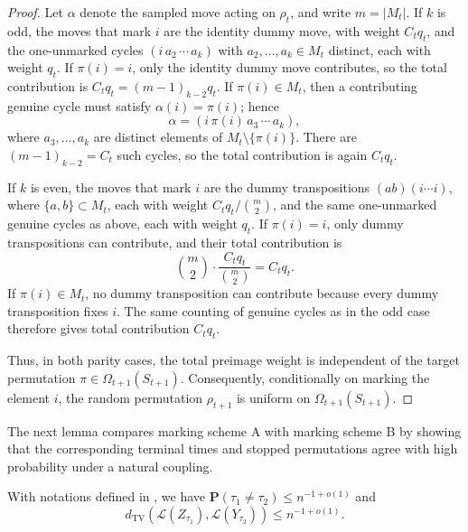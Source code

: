 \begin{proof}
Let $\alpha$ denote the sampled move acting on $\rho_t$, and write
$m=|M_t|$. If $k$ is odd, the moves that mark $i$ are the identity dummy move,
with weight $C_tq_t$, and the one-unmarked cycles
$(i\,a_2\,\cdots\,a_k)$ with $a_2,\ldots,a_k\in M_t$ distinct, each with
weight $q_t$. If $\pi(i)=i$, only the identity dummy move contributes, so the
total contribution is $C_tq_t=(m-1)_{k-2}q_t$. If $\pi(i)\in M_t$, then a
contributing genuine cycle must satisfy $\alpha(i)=\pi(i)$; hence
\[
    \alpha=(i\,\pi(i)\,a_3\,\cdots\,a_k),
\]
where $a_3,\ldots,a_k$ are distinct elements of
$M_t\setminus\{\pi(i)\}$. There are $(m-1)_{k-2}=C_t$ such cycles, so the total
contribution is again $C_tq_t$.

If $k$ is even, the moves that mark $i$ are the dummy transpositions
$(ab)(i\cdots i)$, where $\{a,b\}\subset M_t$, each with weight
$C_tq_t/\binom{m}{2}$, and the same one-unmarked genuine cycles as above, each
with weight $q_t$. If $\pi(i)=i$, only dummy transpositions can contribute, and
their total contribution is
\[
    \binom{m}{2}\cdot \frac{C_tq_t}{\binom{m}{2}}=C_tq_t.
\]
If $\pi(i)\in M_t$, no dummy transposition can contribute because every dummy
transposition fixes $i$. The same counting of genuine cycles as in the odd case
therefore gives total contribution $C_tq_t$.

Thus, in both parity cases, the total preimage weight is independent of the
target permutation $\pi\in\Omega_{t+1}(S_{t+1})$. Consequently, conditionally on
marking the element $i$, the random permutation $\rho_{t+1}$ is uniform on
$\Omega_{t+1}(S_{t+1})$.
\end{proof} 


The next lemma compares marking scheme A with marking scheme B by showing that the corresponding terminal times and stopped permutations agree with high probability under a natural coupling.

\begin{lemma}\label{lem: Z and Y}
    With notations defined in , we have $\mathbf P(\tau_1\neq \tau_2)\le n^{-1+o(1)}$
    and
    $$d_{\mathrm{TV}}(\mathcal{L}(Z_{\tau_1}),\mathcal{L}(Y_{\tau_2})) \leq n^{-1+o(1)}.$$
\end{lemma}

